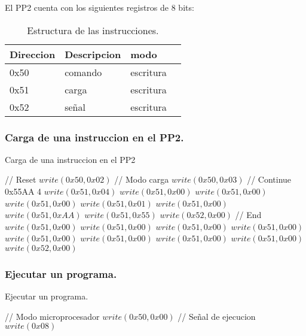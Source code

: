 El PP2 cuenta con los siguientes registros de 8 bits:

\begin{table}[ht]
    \centering
    \begin{tabular}{|l|l|l|l|}
    \hline
    Direccion  & Descripcion & modo  \\
    \hline
    0x50 & comando & escritura\\
    \hline
    0x51 & carga   & escritura\\
    \hline
    0x52 & señal   & escritura \\
    \hline
\end{tabular}
\caption{\label{tab:pp2_ins}Estructura de las instrucciones.}
\end{table}
\newpage
\subsubsection{Carga de una instruccion en el PP2.}
\begin{algorithm}
    \caption{Carga de una instruccion en el PP2}\label{algo_pp2_load}
    \begin{algorithmic}[1]
    \State // {Reset}
    \State $write(0x50, 0x02)$
    \State // {Modo carga}
    \State $write(0x50, 0x03)$
    \State // {Continue 0x55AA 4}
    \State $write(0x51, 0x04)$
    \State $write(0x51,0x00)$
    \State $write(0x51,0x00)$
    \State $write(0x51,0x00)$
    \State $write(0x51,0x01)$
    \State $write(0x51,0x00)$
    \State $write(0x51,0xAA)$
    \State $write(0x51,0x55)$
    \State $write(0x52, 0x00)$
    \State // {End}
    \State $write(0x51,0x00)$
    \State $write(0x51,0x00)$
    \State $write(0x51,0x00)$
    \State $write(0x51,0x00)$
    \State $write(0x51,0x00)$
    \State $write(0x51,0x00)$
    \State $write(0x51,0x00)$
    \State $write(0x51,0x00)$
    \State $write(0x52,0x00)$
    \EndProcedure
    \end{algorithmic}
    \end{algorithm}

\subsubsection{Ejecutar un programa.}
\begin{algorithm}
    \caption{Ejecutar un programa.}\label{algo_pp2_exe}
    \begin{algorithmic}[1]
    \State // {Modo microprocesador}
    \State $write(0x50, 0x00)$
    \State // {Señal de ejecucion}
    \State $write(0x08)$
    \EndProcedure
    \end{algorithmic}
    \end{algorithm}
\newpage

